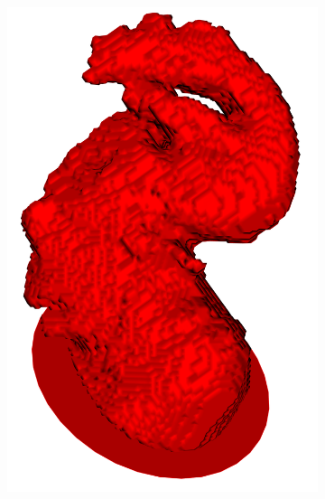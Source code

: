 \documentclass[review]{elsarticle}
\begin{document}
\begin{figure}[t]
\begin{subfigure}[b]{.12\linewidth}
  \end{subfigure}%
  \begin{subfigure}[b]{.12\linewidth}
    \centering
    \includegraphics[width=\textwidth]{fig11_7.png}
  \end{subfigure}%
  \begin{subfigure}[b]{.12\linewidth}
    \centering

\end{subfigure}
\end{figure}
\end{document}
